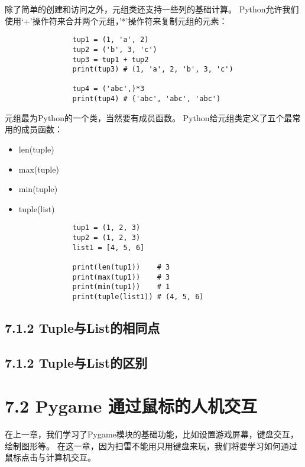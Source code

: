 \documentclass[12pt]{article}
\begin{document}
            除了简单的创建和访问之外，元组类还支持一些列的基础计算。
            Python允许我们使用‘+’操作符来合并两个元组，'*'操作符来复制元组的元素：
            \begin{lstlisting}
                tup1 = (1, 'a', 2)
                tup2 = ('b', 3, 'c')
                tup3 = tup1 + tup2
                print(tup3) # (1, 'a', 2, 'b', 3, 'c')

                tup4 = ('abc',)*3
                print(tup4) # ('abc', 'abc', 'abc')
            \end{lstlisting}

            元组最为Python的一个类，当然要有成员函数。
            Python给元组类定义了五个最常用的成员函数：
            \begin{itemize}
                \item len(tuple)
                \item max(tuple)
                \item min(tuple)
                \item tuple(list)
            \end{itemize}
            \begin{lstlisting}
                tup1 = (1, 2, 3)
                tup2 = (1, 2, 3)
                list1 = [4, 5, 6]
                
                print(len(tup1))    # 3
                print(max(tup1))    # 3
                print(min(tup1))    # 1
                print(tuple(list1)) # (4, 5, 6)
            \end{lstlisting}

        \subsection*{7.1.2 Tuple与List的相同点}


        \subsection*{7.1.2 Tuple与List的区别}





    
    \section*{7.2 Pygame 通过鼠标的人机交互}
        在上一章，我们学习了Pygame模块的基础功能，比如设置游戏屏幕，键盘交互，绘制图形等。
        在这一章，因为扫雷不能用只用键盘来玩，我们将要学习如何通过鼠标点击与计算机交互。
\end{document}
